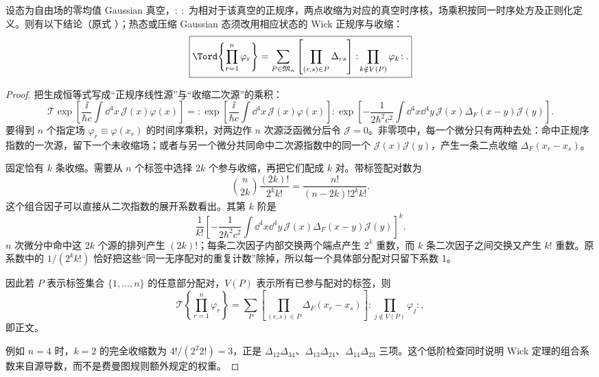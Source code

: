 \begin{proposition}
设态为自由场的零均值 Gaussian 真空，$:\ :$ 为相对于该真空的正规序，两点收缩为对应的真空时序核，场乘积按同一时序处方及正则化定义。则有以下结论（原式 ）；热态或压缩 Gaussian 态须改用相应状态的 Wick 正规序与收缩：
\begin{equation*}
\boxed{
\Tord\!\left\{\prod_{r=1}^{n}\varphi_r\right\}
=\sum_{P\in\mathfrak M_n}
\left[\prod_{(r,s)\in P}\Delta_{rs}\right]
:\!\prod_{k\notin V(P)}\varphi_k\!: .}
\end{equation*}
\end{proposition}
\begin{proof}
把生成恒等式写成“正规序线性源”与“收缩二次源”的乘积：
\begin{equation*}
 \mathcal T\exp\!\left[
 \frac{\ii}{\hbar c}\int\dd^4x\,\mathcal J(x)\varphi(x)
 \right]
 =:\exp\!\left[
 \frac{\ii}{\hbar c}\int\dd^4x\,\mathcal J(x)\varphi(x)
 \right]:
 \exp\!\left[-\frac{1}{2\hbar^2c^2}
 \int\dd^4x\dd^4y\,\mathcal J(x)\Delta_F(x-y)\mathcal J(y)
 \right].
\end{equation*}
要得到 $n$ 个指定场 $\varphi_r\equiv\varphi(x_r)$ 的时间序乘积，对两边作 $n$ 次源泛函微分后令 $\mathcal J=0$。非零项中，每一个微分只有两种去处：命中正规序指数的一次源，留下一个未收缩场；或者与另一个微分共同命中二次源指数中的同一个 $\mathcal J(x)\mathcal J(y)$，产生一条二点收缩 $\Delta_F(x_r-x_s)$。

固定恰有 $k$ 条收缩。需要从 $n$ 个标签中选择 $2k$ 个参与收缩，再把它们配成 $k$ 对。带标签配对数为
\begin{equation*}
 \binom{n}{2k}\frac{(2k)!}{2^k k!}
 =\frac{n!}{(n-2k)!2^k k!}.
\end{equation*}
这个组合因子可以直接从二次指数的展开系数看出。其第 $k$ 阶是
\begin{equation*}
 \frac{1}{k!}
 \left[-\frac{1}{2\hbar^2c^2}
 \int\dd^4x\dd^4y\,
 \mathcal J(x)\Delta_F(x-y)\mathcal J(y)
 \right]^k.
\end{equation*}
$n$ 次微分中命中这 $2k$ 个源的排列产生 $(2k)!$；每条二次因子内部交换两个端点产生 $2^k$ 重数，而 $k$ 条二次因子之间交换又产生 $k!$ 重数。原系数中的 $1/(2^kk!)$ 恰好把这些“同一无序配对的重复计数”除掉，所以每一个具体部分配对只留下系数 1。

因此若 $P$ 表示标签集合 $\{1,\ldots,n\}$ 的任意部分配对，$V(P)$ 表示所有已参与配对的标签，则
\begin{equation*}
 \mathcal T\!\left\{\prod_{r=1}^n\varphi_r\right\}
 =\sum_{P}
 \left[\prod_{(r,s)\in P}\Delta_F(x_r-x_s)\right]
 :\!\prod_{j\notin V(P)}\varphi_j\!:,
\end{equation*}
即正文。

例如 $n=4$ 时，$k=2$ 的完全收缩数为
$4!/(2^2 2!)=3$，正是
$\Delta_{12}\Delta_{34}$、$\Delta_{13}\Delta_{24}$、$\Delta_{14}\Delta_{23}$ 三项。这个低阶检查同时说明 Wick 定理的组合系数来自源导数，而不是费曼图规则额外规定的权重。
\end{proof}

